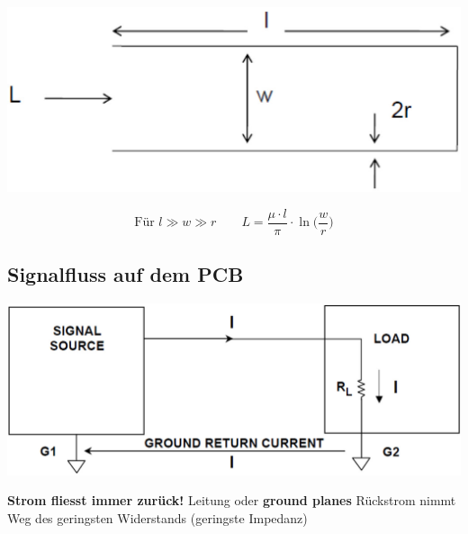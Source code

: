 \begin{minipage}[c]{0.48\columnwidth}
    \includegraphics[width=\columnwidth]{images/leitung_induktivitaet.jpg}
\end{minipage}
\hfill
\begin{minipage}[c]{0.48\columnwidth}
    $$ \boxed{ \text{Für } l \gg w \gg r \qquad L = \frac{\mu \cdot l}{\pi} \cdot \ln \Bigg( \frac{w}{r} \Bigg) } $$
\end{minipage}


\subsection{Signalfluss auf dem PCB}

\begin{minipage}[c]{0.48\columnwidth}
    \includegraphics[width=\columnwidth]{images/signalfluss_pcb.jpg}
\end{minipage}
\hfill
\begin{minipage}[c]{0.48\columnwidth}
    \begin{outline}
        \1 \textbf{Strom fliesst immer zurück!}
            \2 Leitung oder \textbf{ground planes}
        \1 Rückstrom nimmt Weg des geringsten Widerstands (geringste Impedanz)
    \end{outline}
\end{minipage}

